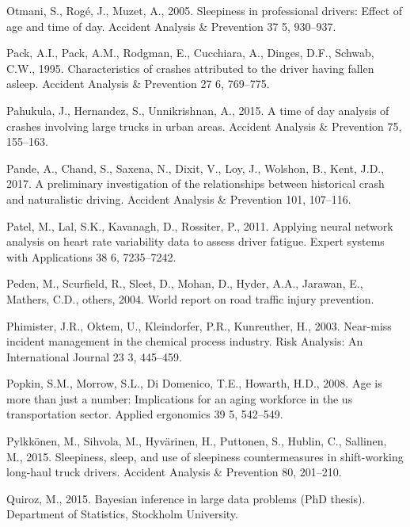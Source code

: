 \documentclass[12pt]{book}
\numberwithin{equation}{chapter}
\begin{document}
\leavevmode\hypertarget{ref-otmani2005sleepiness}{}%
Otmani, S., Rogé, J., Muzet, A., 2005. Sleepiness in professional drivers: Effect of age and time of day. Accident Analysis \& Prevention 37 5, 930--937.

\leavevmode\hypertarget{ref-pack1995characteristics}{}%
Pack, A.I., Pack, A.M., Rodgman, E., Cucchiara, A., Dinges, D.F., Schwab, C.W., 1995. Characteristics of crashes attributed to the driver having fallen asleep. Accident Analysis \& Prevention 27 6, 769--775.

\leavevmode\hypertarget{ref-pahukula2015time}{}%
Pahukula, J., Hernandez, S., Unnikrishnan, A., 2015. A time of day analysis of crashes involving large trucks in urban areas. Accident Analysis \& Prevention 75, 155--163.

\leavevmode\hypertarget{ref-pande2017preliminary}{}%
Pande, A., Chand, S., Saxena, N., Dixit, V., Loy, J., Wolshon, B., Kent, J.D., 2017. A preliminary investigation of the relationships between historical crash and naturalistic driving. Accident Analysis \& Prevention 101, 107--116.

\leavevmode\hypertarget{ref-patel2011applying}{}%
Patel, M., Lal, S.K., Kavanagh, D., Rossiter, P., 2011. Applying neural network analysis on heart rate variability data to assess driver fatigue. Expert systems with Applications 38 6, 7235--7242.

\leavevmode\hypertarget{ref-peden2004world}{}%
Peden, M., Scurfield, R., Sleet, D., Mohan, D., Hyder, A.A., Jarawan, E., Mathers, C.D., others, 2004. World report on road traffic injury prevention.

\leavevmode\hypertarget{ref-phimister2003near}{}%
Phimister, J.R., Oktem, U., Kleindorfer, P.R., Kunreuther, H., 2003. Near-miss incident management in the chemical process industry. Risk Analysis: An International Journal 23 3, 445--459.

\leavevmode\hypertarget{ref-popkin2008age}{}%
Popkin, S.M., Morrow, S.L., Di Domenico, T.E., Howarth, H.D., 2008. Age is more than just a number: Implications for an aging workforce in the us transportation sector. Applied ergonomics 39 5, 542--549.

\leavevmode\hypertarget{ref-pylkkonen2015sleepiness}{}%
Pylkkönen, M., Sihvola, M., Hyvärinen, H., Puttonen, S., Hublin, C., Sallinen, M., 2015. Sleepiness, sleep, and use of sleepiness countermeasures in shift-working long-haul truck drivers. Accident Analysis \& Prevention 80, 201--210.

\leavevmode\hypertarget{ref-quiroz2015bayesian}{}%
Quiroz, M., 2015. Bayesian inference in large data problems (PhD thesis). Department of Statistics, Stockholm University.
\end{document}
